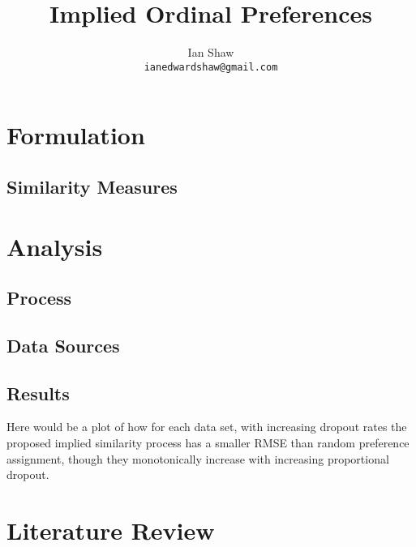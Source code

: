 \documentclass{article}
\title{Implied Ordinal Preferences}
\author{Ian Shaw \\ \texttt{ianedwardshaw@gmail.com}}
\begin{document}
\maketitle

\begin{abstract}

\end{abstract}


\newpage

\tableofcontents

\newpage

\section{Formulation}



\subsection{Similarity Measures}



\section{Analysis}

\subsection{Process}



\subsection{Data Sources}



\subsection{Results}

Here would be a plot of how for each data set, with increasing dropout rates the proposed implied similarity process has a smaller RMSE than random preference assignment, though they monotonically increase with increasing proportional dropout.

\section{Literature Review}
\end{document}
